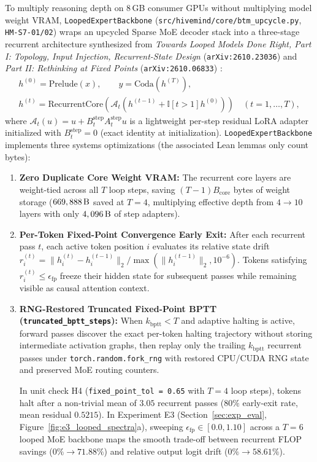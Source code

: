 \documentclass[11pt,a4paper]{article}
\begin{document}
To multiply reasoning depth on 8\,GB consumer GPUs without multiplying model weight VRAM, \texttt{LoopedExpertBackbone} (\texttt{src/hivemind/core/btm\_upcycle.py}, \texttt{HM-S7-01/02}) wraps an upcycled Sparse MoE decoder stack into a three-stage recurrent architecture synthesized from \textit{Towards Looped Models Done Right, Part I: Topology, Input Injection, Recurrent-State Design} (\texttt{arXiv:2610.23036}) \cite{loopedmoe2026} and \textit{Part II: Rethinking at Fixed Points} (\texttt{arXiv:2610.06833}) \cite{loopedfp2026}:
\begin{gather}
    h^{(0)} = \text{Prelude}(x), \qquad y = \text{Coda}\!\left(h^{(T)}\right), \nonumber\\
    h^{(t)} = \text{RecurrentCore}\!\left( \mathcal{A}_t\!\left(h^{(t-1)} + \mathbb{I}[t > 1] h^{(0)}\right) \right) \quad (t = 1, \dots, T),
\end{gather}
where $\mathcal{A}_t(u) = u + B_t^{\text{step}} A_t^{\text{step}} u$ is a lightweight per-step residual LoRA adapter initialized with $B_t^{\text{step}} = 0$ (exact identity at initialization). \texttt{LoopedExpertBackbone} implements three systems optimizations (the associated Lean lemmas only count bytes):
\begin{enumerate}[leftmargin=1.8em]
    \item \textbf{Zero Duplicate Core Weight VRAM:} The recurrent core layers are weight-tied across all $T$ loop steps, saving $(T - 1) B_{\text{core}}$ bytes of weight storage ($669,888\text{\,B}$ saved at $T=4$, multiplying effective depth from $4 \to 10$ layers with only $4,096\text{\,B}$ of step adapters).
    \item \textbf{Per-Token Fixed-Point Convergence Early Exit:} After each recurrent pass $t$, each active token position $i$ evaluates its relative state drift $r_i^{(t)} = \|h_i^{(t)} - h_i^{(t-1)}\|_2 / \max(\|h_i^{(t-1)}\|_2, 10^{-6})$. Tokens satisfying $r_i^{(t)} \le \epsilon_{\text{fp}}$ freeze their hidden state for subsequent passes while remaining visible as causal attention context.
    \item \textbf{RNG-Restored Truncated Fixed-Point BPTT (\texttt{truncated\_bptt\_steps}):} When $k_{\text{bptt}} < T$ and adaptive halting is active, forward passes discover the exact per-token halting trajectory without storing intermediate activation graphs, then replay only the trailing $k_{\text{bptt}}$ recurrent passes under \texttt{torch.random.fork\_rng} with restored CPU/CUDA RNG state and preserved MoE routing counters.\par
In unit check H4 (\texttt{fixed\_point\_tol = 0.65} with $T=4$ loop steps), tokens halt after a non-trivial mean of $\mathbf{3.05}$ recurrent passes ($80\%$ early-exit rate, mean residual $0.5215$). In Experiment E3 (Section~\ref{sec:exp_eval}, Figure~\ref{fig:e3_looped_spectra}a), sweeping $\epsilon_{\text{fp}} \in [0.0, 1.10]$ across a $T=6$ looped MoE backbone maps the smooth trade-off between recurrent FLOP savings ($0\% \to 71.88\%$) and relative output logit drift ($0\% \to 58.61\%$).
\end{enumerate}
\end{document}
